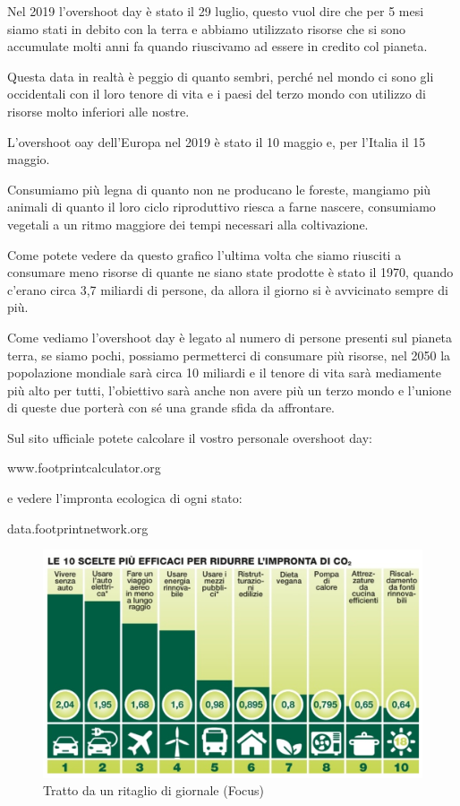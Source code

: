 \documentclass[12pt]{book} %
\begin{document}
Nel 2019 l'overshoot day è stato il 29 luglio, questo vuol dire che per 5 mesi siamo stati in
debito con la terra e abbiamo utilizzato risorse che si sono accumulate molti anni fa quando riuscivamo ad essere in
credito col pianeta.

Questa data in realtà è peggio di quanto sembri, perché nel mondo ci sono gli occidentali con il loro tenore di vita e i
paesi del terzo mondo con utilizzo di risorse molto inferiori alle nostre.

L'overshoot oay dell'Europa nel 2019 è stato il 10 maggio e, per l'Italia il
15 maggio.


\bigskip

Consumiamo più legna di quanto non ne producano le foreste, mangiamo più animali di quanto il loro ciclo riproduttivo
riesca a farne nascere, consumiamo vegetali a un ritmo maggiore dei tempi necessari alla coltivazione. 

Come potete vedere da questo grafico l'ultima volta che siamo riusciti a consumare meno risorse di
quante ne siano state prodotte è stato il 1970, quando c'erano circa 3,7 miliardi di persone, da
allora il giorno si è avvicinato sempre di
più.


\bigskip

Come vediamo l'overshoot day è legato al numero di persone presenti sul pianeta terra, se siamo
pochi, possiamo permetterci di consumare più risorse, nel 2050 la popolazione mondiale sarà circa 10 miliardi e il
tenore di vita sarà mediamente più alto per tutti, l'obiettivo sarà anche non avere più un terzo
mondo e l'unione di queste due porterà con sé una grande sfida da
affrontare.


\bigskip

Sul sito ufficiale potete calcolare il vostro personale overshoot day:

www.footprintcalculator.org 

e vedere l'impronta ecologica di ogni stato:

data.footprintnetwork.org


\bigskip

\begin{figure}[H]
  \centering
  \includegraphics[width=0.95\linewidth]{images/Libro-img019.jpg}
  \caption{Tratto da un ritaglio di giornale (Focus)}
\end{figure}
\end{document}
